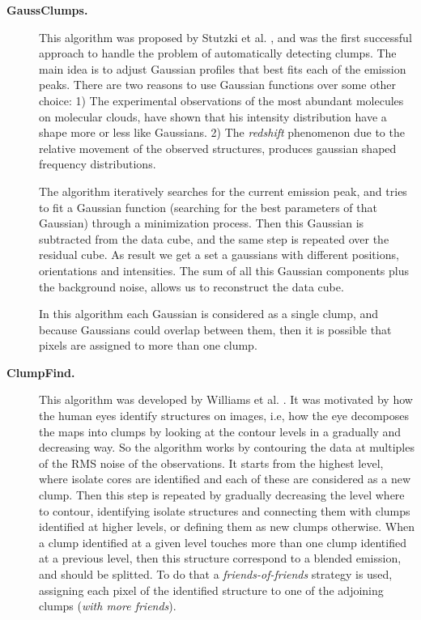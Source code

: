 \documentclass[letter, 11pt]{article}
\begin{document}
\begin{description}
    \item[\textbf{GaussClumps.}] This algorithm was proposed by Stutzki et al. \cite{Stutzki}, and was the first successful approach to handle the problem of automatically detecting clumps. The main idea is to adjust Gaussian profiles that best fits each of the emission peaks. There are two reasons to use Gaussian functions over some other choice: 1) The experimental observations of the most abundant molecules on molecular clouds, have shown that his intensity distribution have a shape more or less like Gaussians. 2) The \textit{redshift}  phenomenon due to the relative movement of the observed structures, produces gaussian shaped frequency distributions.

    The algorithm iteratively searches for the current emission peak, and tries to fit a Gaussian function (searching for the best parameters of that Gaussian) through a minimization process. Then this Gaussian is subtracted from the data cube, and the same step is repeated over the residual cube. As result we get a set a gaussians with different positions, orientations and intensities. The sum of all this Gaussian components plus the background noise, allows us to reconstruct the data cube.

    In this algorithm each Gaussian is considered as a single clump, and because Gaussians could overlap between them, then it is possible that pixels are assigned to more than one clump.


    \item[\textbf{ClumpFind.}] This algorithm was developed by Williams et al. \cite{Williams}.  It was motivated by how the human eyes identify structures on images, i.e, how the eye decomposes the maps into clumps by looking at the contour levels in a gradually and decreasing way. So the algorithm works by contouring the data at multiples of the RMS noise of the observations. It starts from the highest level, where isolate cores are identified and each of these are considered as a new clump. Then this step is repeated by gradually decreasing the level where to contour,  identifying isolate structures and connecting them with clumps identified at higher levels, or defining them as new clumps otherwise. When a clump identified at a given level touches more than one clump identified at a previous level, then this structure correspond to a blended emission, and should be splitted. To do that a \textit{friends-of-friends} strategy is used, assigning each pixel of the identified structure to one of the adjoining clumps (\textit{with more friends}).


\end{description}
\end{document}
